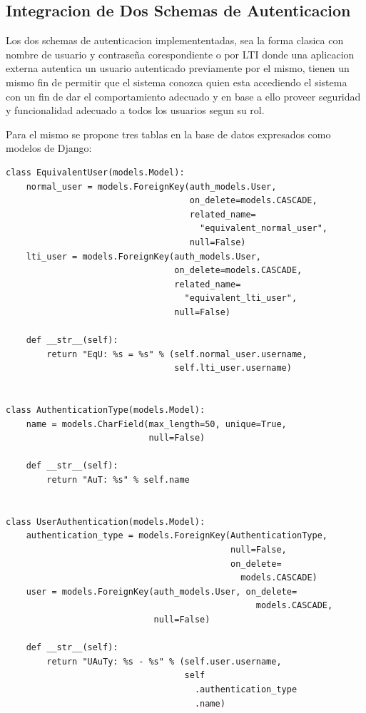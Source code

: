 \subsection{Integracion de Dos Schemas de Autenticacion}
Los dos schemas de autenticacion implemententadas, sea la forma clasica con nombre de usuario y contraseña corespondiente o por LTI donde una aplicacion externa autentica un usuario autenticado previamente por el mismo, tienen un mismo fin de permitir que el sistema conozca quien esta accediendo el sistema con un fin de dar el comportamiento adecuado y en base a ello proveer seguridad y funcionalidad adecuado a todos los usuarios segun su rol.

Para el mismo se propone tres tablas en la base de datos expresados como modelos de Django:
\lstset{language=Python}
\begin{lstlisting}
class EquivalentUser(models.Model):
    normal_user = models.ForeignKey(auth_models.User,
                                    on_delete=models.CASCADE,
                                    related_name=
                                      "equivalent_normal_user",
                                    null=False)
    lti_user = models.ForeignKey(auth_models.User,
                                 on_delete=models.CASCADE,
                                 related_name=
                                   "equivalent_lti_user",
                                 null=False)

    def __str__(self):
        return "EqU: %s = %s" % (self.normal_user.username,
                                 self.lti_user.username)


class AuthenticationType(models.Model):
    name = models.CharField(max_length=50, unique=True,
                            null=False)

    def __str__(self):
        return "AuT: %s" % self.name


class UserAuthentication(models.Model):
    authentication_type = models.ForeignKey(AuthenticationType,
                                            null=False,
                                            on_delete=
                                              models.CASCADE)
    user = models.ForeignKey(auth_models.User, on_delete=
                                                 models.CASCADE,
                             null=False)

    def __str__(self):
        return "UAuTy: %s - %s" % (self.user.username, 
                                   self
                                     .authentication_type
                                     .name)
\end{lstlisting}
